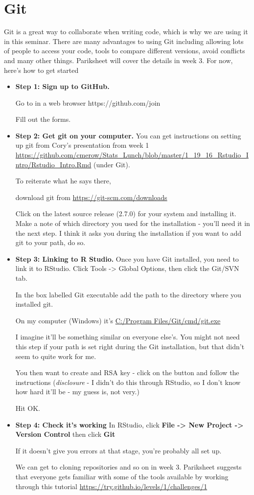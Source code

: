 \documentclass{article}
\begin{document}
\section{Git}
Git is a great way to collaborate when writing code, which is why we are using it in this seminar. There are many advantages to using Git including allowing lots of people to access your code, tools to compare different versions, avoid conflicts and many other things. Pariksheet will cover the details in week 3. For now, here's how to get started

\begin{itemize}

\item \textbf{Step 1: Sign up to GitHub.}

Go to in a web browser
https://github.com/join

Fill out the forms.

\item \textbf{Step 2: Get git on your computer.}
You can get instructions on setting up git from Cory's presentation from week 1 \url{https://github.com/cmerow/Stats_Lunch/blob/master/1_19_16_Rstudio_Intro/Rstudio_Intro.Rmd} (under Git). 

To reiterate what he says there, 

download git from
\url{https://git-scm.com/downloads}

Click on the latest source release (2.7.0) for your system and installing it. Make a note of which directory you used for the installation - you'll need it in the next step. I think it asks you during the installation if you want to add git to your path, do so. 

\item \textbf{Step 3: Linking to R Studio.}
Once you have Git installed, you need to link it to RStudio.
Click Tools -> Global Options, then click the Git/SVN tab. 

In the box labelled Git executable add the path to the directory where you installed git. 

On my computer (Windows) it's \url{C:/Program Files/Git/cmd/git.exe}

I imagine it'll be something similar on everyone else's. You might not need this step if your path is set right during the Git installation, but that didn't seem to quite work for me.

You then want to create and RSA key - click on the button and follow the instructions (\textit{disclosure} - I didn't do this through RStudio, so I don't know how hard it'll be - my guess is, not very.)

Hit OK.

\item \textbf{Step 4: Check it's working}
In RStudio, click \textbf{File -> New Project -> Version Control} then click \textbf{Git}

If it doesn't give you errors at that stage, you're probably all set up. 

We can get to cloning repositories and so on in week 3. Pariksheet suggests that everyone gets familiar with some of the tools available by working through this tutorial \url{https://try.github.io/levels/1/challenges/1}
\end{itemize}
\end{document}
